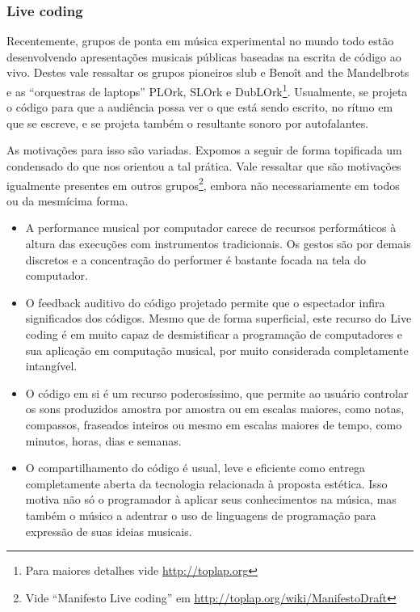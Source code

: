\subsubsection{Live coding}

Recentemente, grupos de ponta em música experimental no mundo todo
estão desenvolvendo apresentações musicais públicas baseadas na
escrita de código ao vivo. Destes vale ressaltar os grupos pioneiros
slub e Benoît and the Mandelbrots e as ``orquestras de laptops''
PLOrk, SLOrk e DubLOrk\footnote{Para maiores detalhes vide
  \url{http://toplap.org}}. Usualmente, se projeta o código para que a
audiência possa ver o que está sendo escrito, no rítmo em que se
escreve, e se projeta também o resultante sonoro por autofalantes.

As motivações para isso são variadas. Expomos a seguir de forma
topificada um condensado do que nos orientou a tal prática. Vale
ressaltar que são motivações igualmente presentes em outros
grupos\footnote{Vide ``Manifesto Live coding'' em
  \url{http://toplap.org/wiki/ManifestoDraft}}, embora não
necessariamente em todos ou da mesmícima forma.

\begin{itemize}
    \item A performance musical por computador carece de recursos
      performáticos à altura das execuções com instrumentos
      tradicionais. Os gestos são por demais discretos e a
      concentração do performer é bastante focada na tela do
      computador.
    \item O feedback auditivo do código projetado permite que o
      espectador infira significados dos códigos. Mesmo que de forma
      superficial, este recurso do Live coding é em muito capaz de
      desmistificar a programação de computadores e sua aplicação em
      computação musical, por muito considerada completamente
      intangível.
    \item O código em si é um recurso poderosíssimo, que permite ao
      usuário controlar os sons produzidos amostra por amostra ou em
      escalas maiores, como notas, compassos, fraseados inteiros ou
      mesmo em escalas maiores de tempo, como minutos, horas, dias e
      semanas.
    \item O compartilhamento do código é usual, leve e eficiente como
      entrega completamente aberta da tecnologia relacionada à
      proposta estética. Isso motiva não só o programador à aplicar
      seus conhecimentos na música, mas também o músico a adentrar o
      uso de linguagens de programação para expressão de suas ideias
      musicais.
\end{itemize}

